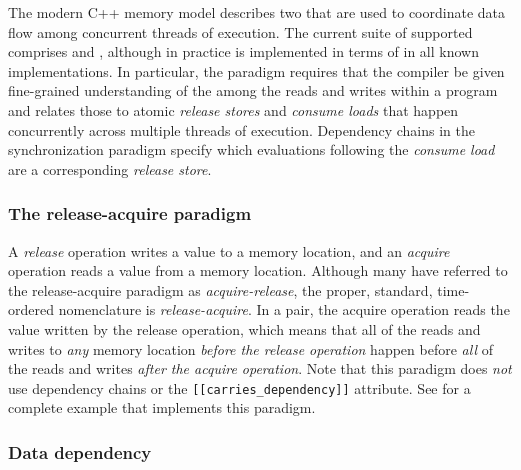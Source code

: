 The modern C++ memory model describes two  that are used
to coordinate data flow among concurrent threads of execution. The current suite of supported
 comprises  and , although in practice
 is implemented in terms of  in all known implementations. In
particular, the  paradigm requires that the
compiler be given fine-grained understanding of the  among the reads and writes within a program
and relates those to atomic \emph{release stores} and \emph{consume
loads} that happen concurrently across multiple threads of execution.
Dependency chains in the  synchronization
paradigm specify which evaluations following the \emph{consume load} are
 a corresponding \emph{release store}.

\subsubsection[The release-acquire paradigm]{The release-acquire paradigm}\label{the-release-acquire-paradigm}

A \emph{release} operation writes a value to a memory location, and an
\emph{acquire} operation reads a value from a memory location. Although many have
referred to the release-acquire paradigm as \emph{acquire-release}, the proper, standard,
  time-ordered nomenclature is \emph{release-acquire}. In a  pair, the acquire operation reads the value written by
the release operation, which means that all of the reads and writes to
\emph{any} memory location \emph{before the release operation} happen
before \emph{all} of the reads and writes \emph{after the acquire operation}. Note that this paradigm does \emph{not} use 
dependency chains or the \lstinline![[carries_dependency]]! attribute. See  
for a
complete example that implements this paradigm.

\subsubsection[Data dependency]{Data dependency}\label{data-dependency}


